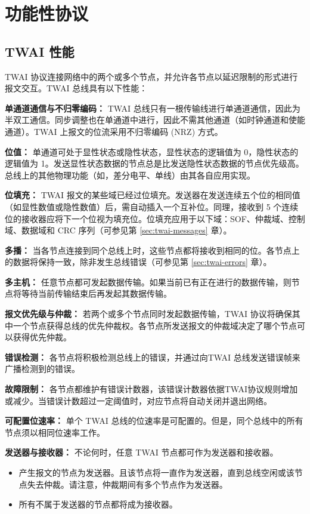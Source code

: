 \documentclass[main\_\_CN.tex]{subfiles}
\begin{document}
\section{功能性协议}
\label{sec:twai-functional-protocol}
\subsection{TWAI 性能}
TWAI 协议连接网络中的两个或多个节点，并允许各节点以延迟限制的形式进行报文交互。TWAI 总线具有以下性能：

{\bfseries 单通道通信与不归零编码：} TWAI 总线只有一根传输线进行单通道通信，因此为半双工通信。同步调整也在单通道中进行，因此不需其他通道（如时钟通道和使能通道）。TWAI 上报文的位流采用不归零编码 (NRZ) 方式。

{\bfseries 位值：} 单通道可处于显性状态或隐性状态，显性状态的逻辑值为 0，隐性状态的逻辑值为 1。发送显性状态数据的节点总是比发送隐性状态数据的节点优先级高。总线上的其他物理功能（如，差分电平、单线）由其各自应用实现。

{\bfseries 位填充：} TWAI 报文的某些域已经过位填充。发送器在发送连续五个位的相同值（如显性数值或隐性数值）后，需自动插入一个互补位。同理，接收到 5 个连续位的接收器应将下一个位视为填充位。位填充应用于以下域：SOF、仲裁域、控制域、数据域和 CRC 序列（可参见第 \ref{sec:twai-messages} 章）。

{\bfseries 多播：} 当各节点连接到同个总线上时，这些节点都将接收到相同的位。各节点上的数据将保持一致，除非发生总线错误（可参见第 \ref{sec:twai-errors} 章）。

{\bfseries 多主机：} 任意节点都可发起数据传输。如果当前已有正在进行的数据传输，则节点将等待当前传输结束后再发起其数据传输。

{\bfseries 报文优先级与仲裁：} 若两个或多个节点同时发起数据传输，TWAI 协议将确保其中一个节点获得总线的优先仲裁权。各节点所发送报文的仲裁域决定了哪个节点可以获得优先仲裁。

{\bfseries 错误检测：} 各节点将积极检测总线上的错误，并通过向TWAI 总线发送错误帧来广播检测到的错误。

{\bfseries 故障限制：} 各节点都维护有错误计数器，该错误计数器依据TWAI协议规则增加或减少。当错误计数超过一定阈值时，对应节点将自动关闭并退出网络。

{\bfseries 可配置位速率：} 单个 TWAI 总线的位速率是可配置的。但是，同个总线中的所有节点须以相同位速率工作。

{\bfseries 发送器与接收器：} 不论何时，任意 TWAI 节点都可作为发送器和接收器。
\begin{itemize}
    \item 产生报文的节点为发送器。且该节点将一直作为发送器，直到总线空闲或该节点失去仲裁。请注意，仲裁期间有多个节点作为发送器。
    \item 所有不属于发送器的节点都将成为接收器。
\end{itemize}
\end{document}
